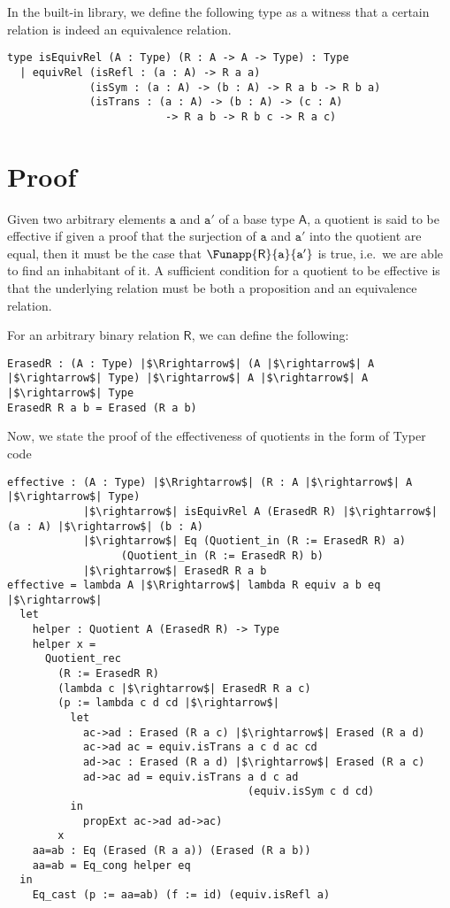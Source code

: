 \documentclass[12pt,twoside,maitrise]{dms}
\theoremstyle{definition}
\numberwithin{equation}{section}
\numberwithin{table}{chapter}
\numberwithin{figure}{chapter}
\newcommand\kw[1] {\textsf{#1}}
\newcommand\id[1] {\texttt{#1}}
\begin{document}
In the built-in library, we define the following type as a witness that a certain relation is indeed an equivalence relation.

\begin{verbatim}
type isEquivRel (A : Type) (R : A -> A -> Type) : Type
  | equivRel (isRefl : (a : A) -> R a a)
             (isSym : (a : A) -> (b : A) -> R a b -> R b a)
             (isTrans : (a : A) -> (b : A) -> (c : A)
                         -> R a b -> R b c -> R a c)
\end{verbatim}

\section{Proof}
Given two arbitrary elements $\id{a}$ and $\id{a}'$ of a base type $\kw{A}$, a
quotient is said to be effective if given a proof that the surjection of $\id{a}$
and $\id{a}'$ into the quotient are equal, then it must be the case that
$\Funapp{\kw{R}}{\id{a}}{\id{a}'}$ is true, i.e.\ we are able to find an
inhabitant of it. A sufficient condition for a quotient to be effective is that
the underlying relation must be both a proposition and an equivalence relation.

For an arbitrary binary relation $\kw{R}$, we can define the following:

\begin{verbatim}
ErasedR : (A : Type) |$\Rrightarrow$| (A |$\rightarrow$| A |$\rightarrow$| Type) |$\rightarrow$| A |$\rightarrow$| A |$\rightarrow$| Type
ErasedR R a b = Erased (R a b)
\end{verbatim}

Now, we state the proof of the effectiveness of quotients in the form of Typer code

\begin{verbatim}
effective : (A : Type) |$\Rrightarrow$| (R : A |$\rightarrow$| A |$\rightarrow$| Type)
            |$\rightarrow$| isEquivRel A (ErasedR R) |$\rightarrow$| (a : A) |$\rightarrow$| (b : A)
            |$\rightarrow$| Eq (Quotient_in (R := ErasedR R) a)
                  (Quotient_in (R := ErasedR R) b)
            |$\rightarrow$| ErasedR R a b
effective = lambda A |$\Rrightarrow$| lambda R equiv a b eq |$\rightarrow$|
  let
    helper : Quotient A (ErasedR R) -> Type
    helper x =
      Quotient_rec
        (R := ErasedR R)
        (lambda c |$\rightarrow$| ErasedR R a c)
        (p := lambda c d cd |$\rightarrow$|
          let
            ac->ad : Erased (R a c) |$\rightarrow$| Erased (R a d)
            ac->ad ac = equiv.isTrans a c d ac cd
            ad->ac : Erased (R a d) |$\rightarrow$| Erased (R a c)
            ad->ac ad = equiv.isTrans a d c ad
                                      (equiv.isSym c d cd)
          in
            propExt ac->ad ad->ac)
        x
    aa=ab : Eq (Erased (R a a)) (Erased (R a b))
    aa=ab = Eq_cong helper eq
  in
    Eq_cast (p := aa=ab) (f := id) (equiv.isRefl a)
\end{verbatim}
\end{document}
